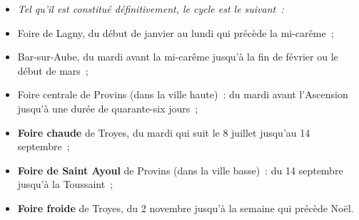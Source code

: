 \documentclass[french,twoside]{book} %
\newlength{\listmod}
\newcommand{\listhead}[1]{\hspace{-1\listmod}\emph{#1}}
\newcommand\term[1]{\textbf{#1}}
\begin{document}
\begin{itemize}[itemsep=0pt,]
\item[]\listhead{Tel qu’il est constitué définitivement, le cycle est le suivant :}
\item Foire de Lagny, du début de janvier au lundi qui précède la mi-carême ;
\item Bar-sur-Aube, du mardi avant la mi-carême jusqu’à la fin de février ou le début de mars ;
\item Foire centrale de Provins (dans la ville haute) : du mardi avant l’Ascension jusqu’à une durée de quarante-six jours ;  
\label{p86}
\item \term{Foire chaude} de Troyes, du mardi qui suit le 8 juillet jusqu’au 14 septembre ;
\item \term{Foire de Saint Ayoul} de Provins (dans la ville basse) : du 14 septembre jusqu’à la Toussaint ;
\item \term{Foire froide} de Troyes, du 2 novembre jusqu’à la semaine qui précède Noël.
\end{itemize}
\end{document}
